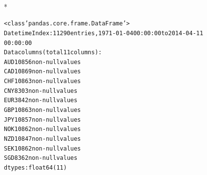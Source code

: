 \documentclass[letterpaper,10pt,english]{/anaconda/lib/python2.7/site-packages/sphinx/texinputs/sphinxhowto}
\def\smaller{\fontsize{9.5pt}{9.5pt}\selectfont}
\newenvironment{InvisibleVerbatim}
        {\begin{mdframed}[leftmargin=0.1\linewidth,innerleftmargin=3pt,innerrightmargin=3pt, userdefinedwidth=1\linewidth, linewidth=0pt, linecolor=white, usetwoside=false]}
        {\end{mdframed}}
\begin{document}
    

        
        

            
                \makebox[0.1\linewidth]{\smaller\hfill\tt\color{nbframe-out-prompt}Out\hspace{4pt}{[}13{]}:\hspace{4pt}}\\*
                \vspace{-2.55\baselineskip}\begin{InvisibleVerbatim}
                \vspace{-0.5\baselineskip}
\begin{alltt}<class 'pandas.core.frame.DataFrame'>
DatetimeIndex: 11290 entries, 1971-01-04 00:00:00 to 2014-04-11
00:00:00
Data columns (total 11 columns):
AUD    10856  non-null values
CAD    10869  non-null values
CHF    10863  non-null values
CNY    8303  non-null values
EUR    3842  non-null values
GBP    10863  non-null values
JPY    10857  non-null values
NOK    10862  non-null values
NZD    10847  non-null values
SEK    10862  non-null values
SGD    8362  non-null values
dtypes: float64(11)\end{alltt}

            \end{InvisibleVerbatim}
            
        
    


\end{document}
